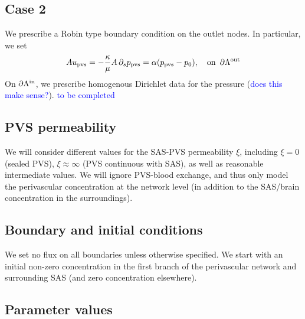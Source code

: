 \documentclass[fleqn,10pt]{wlscirep}
\newcommand{\rami}[1]{\textcolor{blue}{#1}}
\begin{document}
\subsection*{Case 2} We prescribe a Robin type boundary condition on the outlet nodes. In particular, we set 
\begin{equation}
A  u_{\rm pvs} =  - \frac{\kappa}{ \mu} A\, \partial_s p_{\rm pvs} = \alpha (p_{\rm pvs} - p_0), \quad  \rm on \,\,\, \partial \Lambda^{\rm out} 
\end{equation}
On $\partial \Lambda^{\rm in}$, we prescribe homogenous Dirichlet data for the pressure (\rami{does this make sense?}). 
\rami{to be completed }
\subsection*{PVS permeability}
We will consider different values for the SAS-PVS permeability $\xi$, including $\xi = 0$ (sealed PVS), $\xi \approx \infty$ (PVS continuous with SAS), as well as reasonable intermediate values. We will ignore PVS-blood exchange, and thus only model the perivascular concentration at the network level (in addition to the SAS/brain concentration in the surroundings).  

\subsection*{Boundary and initial conditions}
We set no flux on all boundaries unless otherwise specified. We start with an initial non-zero concentration in the first branch of the perivascular network and surrounding SAS (and zero concentration elsewhere).


\subsection*{Parameter values}
\end{document}
